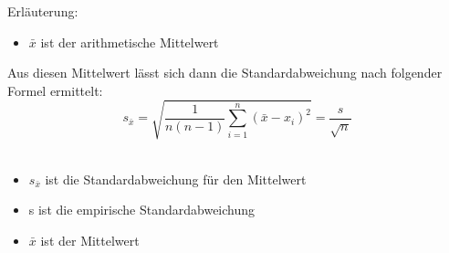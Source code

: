 	Erläuterung:
	\begin{itemize}
	\item $\bar{x}$ ist der arithmetische Mittelwert
	\end{itemize}
	
Aus diesen Mittelwert lässt sich dann die Standardabweichung nach folgender Formel ermittelt:
\\
\begin{equation}
		s_{\bar{x}} = \sqrt{\frac{1}{n(n-1)}\sum_{i=1}^n(\bar{x}-x_i)^2} =\frac{s}{\sqrt{n}}
\end{equation}
\\

\begin{itemize}
\item $s_{\bar{x}}$ ist die Standardabweichung für den Mittelwert
\item s ist die empirische Standardabweichung
\item $\bar{x}$ ist der Mittelwert
\end{itemize}

	

